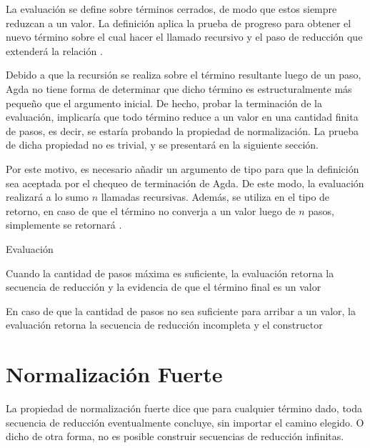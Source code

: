 La evaluación se define sobre términos cerrados, de modo que estos siempre reduzcan a un valor.
La definición aplica la prueba de progreso para obtener el nuevo término sobre el cual hacer el llamado recursivo y el paso de reducción que extenderá la relación \type{$\_\rightsquigarrow\_$}.

Debido a que la recursión se realiza sobre el término resultante luego de un paso, Agda no tiene forma de determinar que dicho término es estructuralmente más pequeño que el argumento inicial.
De hecho, probar la terminación de la evaluación, implicaría que todo término reduce a un valor en una cantidad finita de pasos, es decir, se estaría probando la propiedad de normalización.
La prueba de dicha propiedad no es trivial, y se presentará en la siguiente sección.

Por este motivo, es necesario añadir un argumento de tipo  para que la definición sea aceptada por el chequeo de terminación de Agda.
De este modo, la evaluación realizará a lo sumo $n$ llamadas recursivas.
Además, se utiliza  en el tipo de retorno, en caso de que el término no converja a un valor luego de $n$ pasos, simplemente se retornará .


\begin{codigo}
	Evaluación
\end{codigo}

\begin{example}
	Cuando la cantidad de pasos máxima es suficiente, la evaluación retorna la secuencia de reducción y la evidencia de que el término final es un valor
\end{example}

\begin{example}
	En caso de que la cantidad de pasos no sea suficiente para arribar a un valor, la evaluación retorna la secuencia de reducción incompleta y el constructor 
\end{example}

\section{Normalización Fuerte}

La propiedad de normalización fuerte dice que para cualquier término dado, toda secuencia de reducción eventualmente concluye, sin importar el camino elegido.
O dicho de otra forma, no es posible construir secuencias de reducción infinitas.

